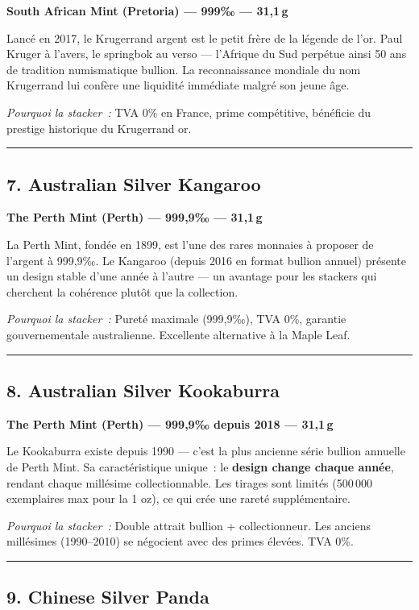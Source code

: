 \documentclass[14pt,a4paper]{extarticle}
\newcommand{\permil}{‰}
\newcommand{\goldsep}{%
  \begin{center}
    \textcolor{gold}{\rule{6cm}{0.4pt}}
  \end{center}
}
\begin{document}
\textbf{South African Mint (Pretoria) --- 999\permil{} --- 31,1\,g}

Lancé en 2017, le Krugerrand argent est le petit frère de la légende de l'or. Paul Kruger à l'avers, le springbok au verso --- l'Afrique du Sud perpétue ainsi 50 ans de tradition numismatique bullion. La reconnaissance mondiale du nom Krugerrand lui confère une liquidité immédiate malgré son jeune âge.

\textit{Pourquoi la stacker~:} TVA 0\% en France, prime compétitive, bénéficie du prestige historique du Krugerrand or.

\goldsep

\subsection{7. Australian Silver Kangaroo}

\textbf{The Perth Mint (Perth) --- 999,9\permil{} --- 31,1\,g}

La Perth Mint, fondée en 1899, est l'une des rares monnaies à proposer de l'argent à 999,9\permil{}. Le Kangaroo (depuis 2016 en format bullion annuel) présente un design stable d'une année à l'autre --- un avantage pour les stackers qui cherchent la cohérence plutôt que la collection.

\textit{Pourquoi la stacker~:} Pureté maximale (999,9\permil{}), TVA 0\%, garantie gouvernementale australienne. Excellente alternative à la Maple Leaf.

\goldsep

\subsection{8. Australian Silver Kookaburra}

\textbf{The Perth Mint (Perth) --- 999,9\permil{} depuis 2018 --- 31,1\,g}

Le Kookaburra existe depuis 1990 --- c'est la plus ancienne série bullion annuelle de Perth Mint. Sa caractéristique unique~: le \textbf{design change chaque année}, rendant chaque millésime collectionnable. Les tirages sont limités (500\,000 exemplaires max pour la 1 oz), ce qui crée une rareté supplémentaire.

\textit{Pourquoi la stacker~:} Double attrait bullion + collectionneur. Les anciens millésimes (1990--2010) se négocient avec des primes élevées. TVA 0\%.

\goldsep

\subsection{9. Chinese Silver Panda}
\end{document}
